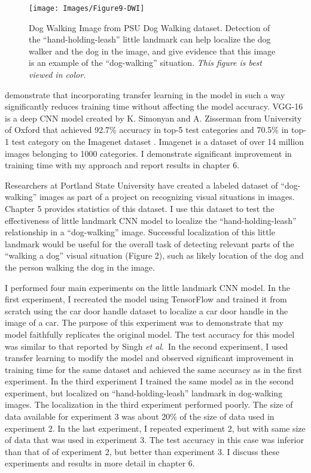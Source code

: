 \documentclass [11pt,letterpaper ,twoside ,openany ]{report}
\begin{document}
    \begin{wrapfigure}{r}[9mm]{0.5\textwidth}
        \begin{center}
            \texttt{[image: Images/Figure9-DWI]}
        \end{center}
        \caption{Dog Walking Image from PSU Dog Walking dataset. Detection of the ``hand-holding-leash'' little landmark can help localize the dog walker and the dog in the image, and give evidence that this image is an example of the ``dog-walking'' situation. \textit{This figure is best viewed in color.}}
    \end{wrapfigure}    

    \noindent
    demonstrate that incorporating transfer learning in the model in such a way significantly reduces training time without affecting the model accuracy. VGG-16 is a deep CNN model created by K. Simonyan and A. Zisserman from University of Oxford that achieved 92.7\% accuracy in top-5 test categories and 70.5\% in top-1 test category on the Imagenet dataset \cite{russakovsky2015imagenet}. Imagenet is a dataset of over 14 million images belonging to 1000 categories. I demonstrate significant improvement in training time with my approach and report results in chapter 6.

    Researchers at Portland State University have created a labeled dataset of ``dog-walking'' images as part of a project on recognizing visual situations in images. Chapter 5 provides statistics of this dataset. I use this dataset to test the effectiveness of little landmark CNN model to localize the ``hand-holding-leash'' relationship in a ``dog-walking'' image. Successful localization of this little landmark would be useful for the overall task of detecting relevant parts of the ``walking a dog'' visual situation (Figure 2), such as likely location of the dog and the person walking the dog in the image.

    I performed four main experiments on the little landmark CNN model. In the first experiment, I recreated the model using TensorFlow \cite{girija2016tensorflow} and trained it from scratch using the car door handle dataset to localize a car door handle in the image of a car. The purpose of this experiment was to demonstrate that my model faithfully replicates the original model. The test accuracy for this model was similar to that reported by Singh \textit{et al}.\ In the second experiment, I used transfer learning to modify the model and observed significant improvement in training time for the same dataset and achieved the same accuracy as in the first experiment. In the third experiment I trained the same model as in the second experiment, but localized on ``hand-holding-leash'' landmark in dog-walking images. The localization in the third experiment performed poorly. The size of data available for experiment 3 was about 20\% of the size of data used in experiment 2. In the last experiment, I repeated experiment 2, but with same size of data that was used in experiment 3. The test accuracy in this case was inferior than that of of experiment 2, but better than experiment 3. I discuss these experiments and results in more detail in chapter 6.
\end{document}
